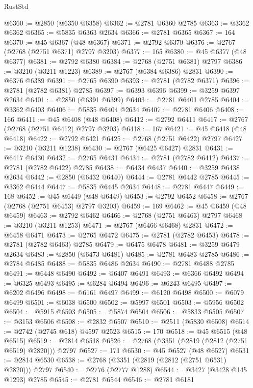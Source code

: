 \begin{lexlean}{RustStd}
\begin{coremodule}
@6360 := @2850 (@6350 @6358)
@6362 := @2781 @6360 @2785
@6363 := @3362 @6362
@6365 := @5835 @6363 @2634
@6366 := @2781 @6365
@6367 := 164
@6370 := @45 @6367 (@48 @6367)
@6371 := @2792 @6370
@6376 := @2767 (@2768 (@2751 @6371) @2797 @3203)
@6377 := 165
@6380 := @45 @6377 (@48 @6377)
@6381 := @2792 @6380
@6384 := @2768 (@2751 @6381) @2797
@6386 := @3210 (@3211 @1223)
@6389 := @2767 (@6384 @6386) @2831
@6390 := @6376 @6389
@6391 := @2765 @6390
@6393 := @2781 (@2782 @6371)
@6396 := @2781 (@2782 @6381) @2785
@6397 := @6393 @6396
@6399 := @3259 @6397 @2634
@6401 := @2850 (@6391 @6399)
@6403 := @2781 @6401 @2785
@6404 := @3362 @6403
@6406 := @5835 @6404 @2634
@6407 := @2781 @6406
@6408 := 166
@6411 := @45 @6408 (@48 @6408)
@6412 := @2792 @6411
@6417 := @2767 (@2768 (@2751 @6412) @2797 @3203)
@6418 := 167
@6421 := @45 @6418 (@48 @6418)
@6422 := @2792 @6421
@6425 := @2768 (@2751 @6422) @2797
@6427 := @3210 (@3211 @1238)
@6430 := @2767 (@6425 @6427) @2831
@6431 := @6417 @6430
@6432 := @2765 @6431
@6434 := @2781 (@2782 @6412)
@6437 := @2781 (@2782 @6422) @2785
@6438 := @6434 @6437
@6440 := @3259 @6438 @2634
@6442 := @2850 (@6432 @6440)
@6444 := @2781 @6442 @2785
@6445 := @3362 @6444
@6447 := @5835 @6445 @2634
@6448 := @2781 @6447
@6449 := 168
@6452 := @45 @6449 (@48 @6449)
@6453 := @2792 @6452
@6458 := @2767 (@2768 (@2751 @6453) @2797 @3203)
@6459 := 169
@6462 := @45 @6459 (@48 @6459)
@6463 := @2792 @6462
@6466 := @2768 (@2751 @6463) @2797
@6468 := @3210 (@3211 @1253)
@6471 := @2767 (@6466 @6468) @2831
@6472 := @6458 @6471
@6473 := @2765 @6472
@6475 := @2781 (@2782 @6453)
@6478 := @2781 (@2782 @6463) @2785
@6479 := @6475 @6478
@6481 := @3259 @6479 @2634
@6483 := @2850 (@6473 @6481)
@6485 := @2781 @6483 @2785
@6486 := @2784 @6485
@6488 := @5835 @6486 @2634
@6490 := @2781 @6488 @2785
@6491 := @6448 @6490
@6492 := @6407 @6491
@6493 := @6366 @6492
@6494 := @6325 @6493
@6495 := @6284 @6494
@6496 := @6243 @6495
@6497 := @6202 @6496
@6498 := @6161 @6497
@6499 := @6120 @6498
@6500 := @6079 @6499
@6501 := @6038 @6500
@6502 := @5997 @6501
@6503 := @5956 @6502
@6504 := @5915 @6503
@6505 := @5874 @6504
@6506 := @5833 @6505
@6507 := @3153 @6506
@6508 := @2832 @6507
@6510 := @2511 (@5830 @6508)
@6514 := @2742 (@2745 @618) @4597 @2523
@6515 := 170
@6518 := @45 @6515 (@48 @6515)
@6519 := @2814 @6518
@6526 := @2768 (@3351 (@2819 (@2812 (@2751 @6519) @2820))) @2797
@6527 := 171
@6530 := @45 @6527 (@48 @6527)
@6531 := @2814 @6530
@6538 := @2768 (@3351 (@2819 (@2812 (@2751 @6531) @2820))) @2797
@6540 := @2776 (@2777 @1288)
@6544 := @3427 (@3428 @145 @1293) @2785
@6545 := @2781 @6544
@6546 := @2781 @6181

\end{coremodule}
\end{lexlean}
